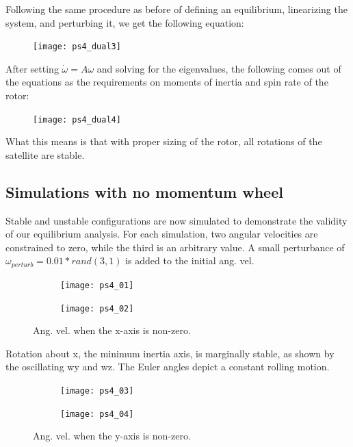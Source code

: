 \documentclass[12pt, letterpaper]{article}
\begin{document}
Following the same procedure as before of defining an equilibrium, linearizing the system, and perturbing it, we get the following equation:

\begin{figure}[H]
	\centering
	\texttt{[image: ps4\_dual3]}
\end{figure}

After setting $\dot{\omega}=A\omega$ and solving for the eigenvalues, the following comes out of the equations as the requirements on moments of inertia and spin rate of the rotor:

\begin{figure}[H]
	\centering
	\texttt{[image: ps4\_dual4]}
\end{figure}

What this means is that with proper sizing of the rotor, all rotations of the satellite are stable.


\subsection{Simulations with no momentum wheel}

Stable and unstable configurations are now simulated to demonstrate the validity of our equilibrium analysis. For each simulation, two angular velocities are constrained to zero, while the third is an arbitrary value. A small perturbance of $\omega_{perturb} = 0.01*rand(3,1)$ is added to the initial ang. vel.

\begin{figure}[H]
	\centering
	\begin{subfigure}[b]{0.49\textwidth}
		\texttt{[image: ps4\_01]}
	\end{subfigure}
	\begin{subfigure}[b]{0.49\textwidth}
		\texttt{[image: ps4\_02]}
	\end{subfigure}
	\caption{Ang. vel. when the x-axis is non-zero.}
	\label{(4:xangvel1)}
\end{figure}

Rotation about x, the minimum inertia axis, is marginally stable, as shown by the oscillating wy and wz. The Euler angles depict a constant rolling motion.


\begin{figure}[H]
	\centering
	\begin{subfigure}[b]{0.49\textwidth}
		\texttt{[image: ps4\_03]}
	\end{subfigure}
	\begin{subfigure}[b]{0.49\textwidth}
		\texttt{[image: ps4\_04]}
	\end{subfigure}
	\caption{Ang. vel. when the y-axis is non-zero.}
	\label{(4:yangvel1)}
\end{figure}
\end{document}
